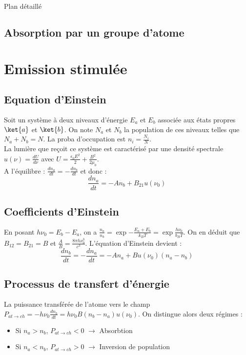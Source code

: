 \begin{reportBlock}{Plan détaillé}
\subsection{Absorption par un groupe d'atome}
\section{Emission stimulée}
\subsection{Equation d'Einstein}
Soit un système à deux niveaux d'énergie $E_a$ et $E_b$ associée aux états propres $\ket{a}$ et $\ket{b}$. On note $N_a$ et $N_b$ la population de ces niveaux telles que $N_a+N_b=N$. La proba d'occupation est $n_i=\frac{N_i}{N}$.\\
La lumière que reçoit ce système est caractérisé par une densité spectrale $u(\nu)=\frac{dU}{d\nu}$ avec $U=\frac{\epsilon_0E^2}{2}+\frac{B^2}{2\mu_0}$.\\


A l'équilibre : $\frac{dn_a}{dt}=-\frac{dn_b}{dt}$ et donc : 
\begin{equation}
    \frac{dn_a}{dt} = -An_b + B_{21}u(\nu_0)
\end{equation}
\subsection{Coefficients d'Einstein}

En posant $h\nu_0 = E_b - E_a$, on a $\frac{n_a}{n_b}=\exp{-\frac{E_a+E_b}{k_BT}} = \exp{\frac{h\nu_0}{b_BT}}$. On en déduit que $B_{12} = B_{21} = B$ et $\frac{A}{B}=\frac{8\pi h\nu_0^3}{c^3}$. L'équation d'Einstein devient : 
\begin{equation}
    \frac{dn_b}{dt} = -\frac{dn_a}{dt} = -An_a + Bu(\nu_0)(n_a-n_b)
\end{equation}

\subsection{Processus de transfert d'énergie}
La puissance transférée de l'atome vers le champ $P_{at\rightarrow ch}=-h\nu_0\frac{dn_b}{dt} = h\nu_0B(n_b-n_a)u(\nu_0)$. On distingue alors deux régimes : 
\begin{itemize}
    \item Si $n_a>n_b$, $P_{at\rightarrow ch}<0$ $\longrightarrow$ Absorbtion
    \item Si $n_a<n_b$, $P_{at\rightarrow ch}>0$ $\longrightarrow$ Inversion de population
\end{itemize}


\end{reportBlock}
